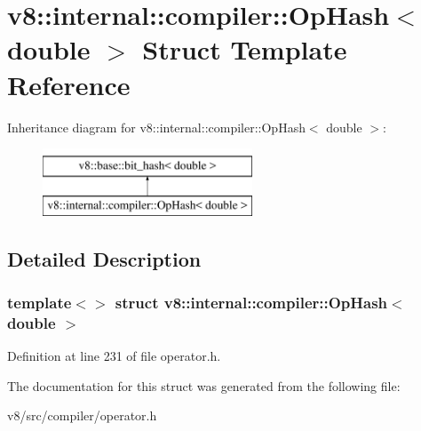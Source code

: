 \hypertarget{structv8_1_1internal_1_1compiler_1_1OpHash_3_01double_01_4}{}\section{v8\+:\+:internal\+:\+:compiler\+:\+:Op\+Hash$<$ double $>$ Struct Template Reference}
\label{structv8_1_1internal_1_1compiler_1_1OpHash_3_01double_01_4}
Inheritance diagram for v8\+:\+:internal\+:\+:compiler\+:\+:Op\+Hash$<$ double $>$\+:\begin{figure}[H]
\begin{center}
\leavevmode
\includegraphics[height=2.000000cm]{structv8_1_1internal_1_1compiler_1_1OpHash_3_01double_01_4}
\end{center}
\end{figure}


\subsection{Detailed Description}
\subsubsection*{template$<$$>$\newline
struct v8\+::internal\+::compiler\+::\+Op\+Hash$<$ double $>$}



Definition at line 231 of file operator.\+h.



The documentation for this struct was generated from the following file\+:\begin{DoxyCompactItemize}
\item 
v8/src/compiler/operator.\+h\end{DoxyCompactItemize}
